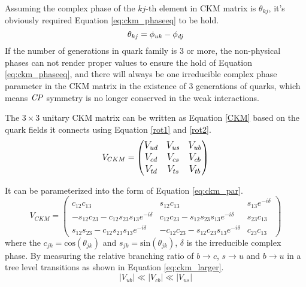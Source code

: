 Assuming the complex phase of the $kj$-th element in CKM matrix is $\theta_{kj}$, it's obviously required Equation \ref{eq:ckm_phaseeq} to be hold.
\begin{equation}\label{eq:ckm_phaseeq}
\large
\theta_{kj} = \phi_{uk}-\phi_{dj}
\end{equation}
If the number of generations in quark family is 3 or more, the non-physical phases can not render proper values to ensure the hold of Equation \ref{eq:ckm_phaseeq}, and there will always be one irreducible complex phase parameter in the CKM matrix in the existence of 3 generations of quarks, which means $\it{CP}$ symmetry is no longer conserved in the weak interactions. 

The $3\times 3$ unitary CKM matrix can be written as Equation \ref{CKM} based on the quark fields it connects using Equation \ref{rot1} and \ref{rot2}.
\begin{equation}\label{CKM}
\large
V_{CKM}=
\begin{pmatrix}
V_{ud} & V_{us} & V_{ub}\\
V_{cd} & V_{cs} & V_{cb}\\
V_{td} & V_{ts} & V_{tb}\\
\end{pmatrix}
\end{equation}

It can be parameterized into the form of Equation \ref{eq:ckm_par}.
\begin{equation}\label{eq:ckm_par}
V_{CKM}=
\begin{pmatrix}
c_{12}c_{13} & s_{12}c_{13} & s_{13}e^{-i\delta }\\
-s_{12}c_{23}-c_{12}s_{23}s_{13}e^{-i\delta } &c_{12}c_{23}-s_{12}s_{23}s_{13}e^{-i\delta } & s_{23}c_{13}\\
s_{12}s_{23}-c_{12}s_{23}s_{13}e^{-i\delta }  & -c_{12}c_{23}-s_{12}c_{23}s_{13}e^{-i\delta } & c_{23}c_{13}
\end{pmatrix}
\end{equation}
where the $c_{jk}=\text{cos}(\theta_{jk})$ and $s_{jk}=\text{sin}(\theta_{jk})$, $\delta$ is the irreducible complex phase. By measuring the relative branching ratio of $b\to c$, $s\to u$ and $b\to u$ in a tree level transitions as shown in Equation \ref{eq:ckm_larger}.
\begin{equation}\label{eq:ckm_larger}
|V_{ub}|\ll |V_{cb}|\ll |V_{us}|
\end{equation}

